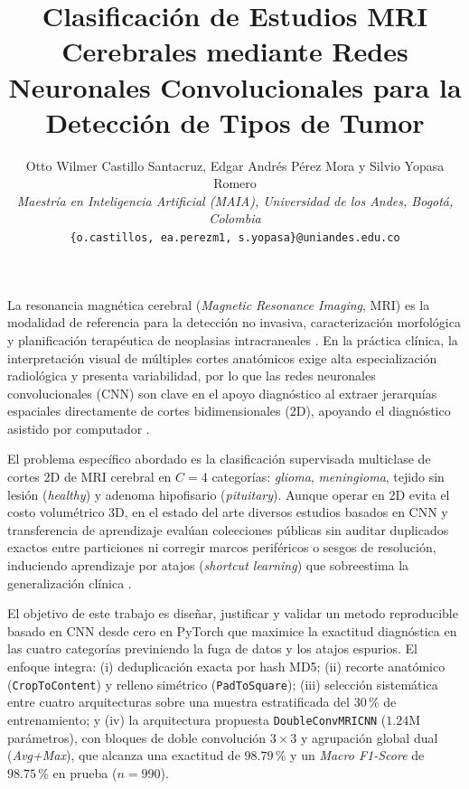 \documentclass[letterpaper, 10 pt, conference]{ieeeconf}
\title{\LARGE \bf
Clasificación de Estudios MRI Cerebrales mediante Redes Neuronales Convolucionales para la Detección de Tipos de Tumor
}
\author{Otto Wilmer Castillo Santacruz, Edgar Andrés Pérez Mora y Silvio Yopasa Romero\\
\textit{Maestría en Inteligencia Artificial (MAIA), Universidad de los Andes, Bogotá, Colombia}\\
{\tt\small \{o.castillos, ea.perezm1, s.yopasa\}@uniandes.edu.co}
}
\makeatletter
\def\section{\@startsection{section}{1}{\z@}{0.9ex plus 0.4ex minus 0.3ex}{0.35ex plus 0.2ex minus 0ex}{\normalfont\normalsize\centering\scshape}}
\makeatother
\begin{document}
\maketitle
\thispagestyle{empty}
\pagestyle{empty}

\section{Introducción}

La resonancia magnética cerebral (\textit{Magnetic Resonance Imaging}, MRI) es la modalidad de referencia para la detección no invasiva, caracterización morfológica y planificación terapéutica de neoplasias intracraneales \cite{c1}. En la práctica clínica, la interpretación visual de múltiples cortes anatómicos exige alta especialización radiológica y presenta variabilidad, por lo que las redes neuronales convolucionales (CNN) son clave en el apoyo diagnóstico al extraer jerarquías espaciales directamente de cortes bidimensionales (2D), apoyando el diagnóstico asistido por computador \cite{c2}.

El problema específico abordado es la clasificación supervisada multiclase de cortes 2D de MRI cerebral en \(C = 4\) categorías: \textit{glioma}, \textit{meningioma}, tejido sin lesión (\textit{healthy}) y adenoma hipofisario (\textit{pituitary}). Aunque operar en 2D evita el costo volumétrico 3D, en el estado del arte diversos estudios basados en CNN y transferencia de aprendizaje \cite{c2} evalúan colecciones públicas sin auditar duplicados exactos entre particiones ni corregir marcos periféricos o sesgos de resolución, induciendo aprendizaje por atajos (\textit{shortcut learning}) que sobreestima la generalización clínica \cite{c3}.

El objetivo de este trabajo es diseñar, justificar y validar un metodo reproducible basado en CNN desde cero en PyTorch que maximice la exactitud diagnóstica en las cuatro categorías previniendo la fuga de datos y los atajos espurios. El enfoque integra: (i) deduplicación exacta por hash MD5; (ii) recorte anatómico (\texttt{CropToContent}) y relleno simétrico (\texttt{PadToSquare}); (iii) selección sistemática entre cuatro arquitecturas sobre una muestra estratificada del \(30\,\%\) de entrenamiento; y (iv) la arquitectura propuesta \texttt{DoubleConvMRICNN} (\(1.24\text{M}\) parámetros), con bloques de doble convolución \(3\times 3\) \cite{c4} y agrupación global dual (\textit{Avg+Max}), que alcanza una exactitud de \(98.79\,\%\) y un \textit{Macro F1-Score} de \(98.75\,\%\) en prueba (\(n=990\)).
\end{document}
